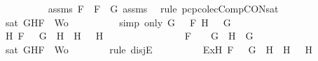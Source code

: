 \begin{isabellebody}
\ \ \ \ \ \ \ \ \isamarkupfalse%
\ assms{\isacharparenleft}{}{\isacharparenright}\ {\isacartoucheopen}F\ {\isacharequal}\ \isactrlbold {\isasymnot}{\isacharparenleft}F{}\ \isactrlbold {\isasymor}\ G{}{\isacharparenright}{\isacartoucheclose}\ assms{\isacharparenleft}{}{\isacharcomma}{}{\isacharcomma}{}{\isacharparenright}\ \isamarkupfalse%
\ {\isacharparenleft}rule\ pcp{\isacharunderscore}colecComp{\isacharunderscore}CON{\isacharunderscore}sat{}{\isacharparenright}\isanewline
\ \ \ \ \ \ \isamarkupfalse%
\ {\isachardoublequoteopen}sat\ {\isacharparenleft}{\isacharbraceleft}G{\isacharcomma}H{\isacharcomma}F{\isacharbraceright}\ {\isasymunion}\ Wo{\isacharparenright}{\isachardoublequoteclose}\isanewline
\ \ \ \ \ \ \ \ \isamarkupfalse%
\ {\isacharparenleft}simp\ only{\isacharcolon}\ {\isacartoucheopen}G\ {\isacharequal}\ \isactrlbold {\isasymnot}\ F{}{\isacartoucheclose}\ {\isacartoucheopen}H\ {\isacharequal}\ \isactrlbold {\isasymnot}\ G{}{\isacartoucheclose}{\isacharparenright}\isanewline
\ \ \ \ \isamarkupfalse%
\isanewline
\ \ \ \ \ \ \isamarkupfalse%
\ {\isachardoublequoteopen}{\isacharparenleft}{\isasymexists}H{}{\isachardot}\ F\ {\isacharequal}\ \isactrlbold {\isasymnot}\ {\isacharparenleft}G\ \isactrlbold {\isasymrightarrow}\ H{}{\isacharparenright}\ {\isasymand}\ H\ {\isacharequal}\ \isactrlbold {\isasymnot}\ H{}{\isacharparenright}\ {\isasymor}\ \isanewline
\ \ \ \ \ \ \ \ \ \ \ \ \ \ F\ {\isacharequal}\ \isactrlbold {\isasymnot}\ {\isacharparenleft}\isactrlbold {\isasymnot}\ G{\isacharparenright}\ {\isasymand}\ H\ {\isacharequal}\ G{\isachardoublequoteclose}\isanewline
\ \ \ \ \ \ \isamarkupfalse%
\ {\isachardoublequoteopen}sat\ {\isacharparenleft}{\isacharbraceleft}G{\isacharcomma}H{\isacharcomma}F{\isacharbraceright}\ {\isasymunion}\ Wo{\isacharparenright}{\isachardoublequoteclose}\isanewline
\ \ \ \ \ \ \isamarkupfalse%
\ {\isacharparenleft}rule\ disjE{\isacharparenright}\isanewline
\ \ \ \ \ \ \ \ \isamarkupfalse%
\ Ex{}{\isacharcolon}{\isachardoublequoteopen}{\isasymexists}H{}{\isachardot}\ F\ {\isacharequal}\ \isactrlbold {\isasymnot}\ {\isacharparenleft}G\ \isactrlbold {\isasymrightarrow}\ H{}{\isacharparenright}\ {\isasymand}\ H\ {\isacharequal}\ \isactrlbold {\isasymnot}\ H{}{\isachardoublequoteclose}\isanewline

\end{isabellebody}
